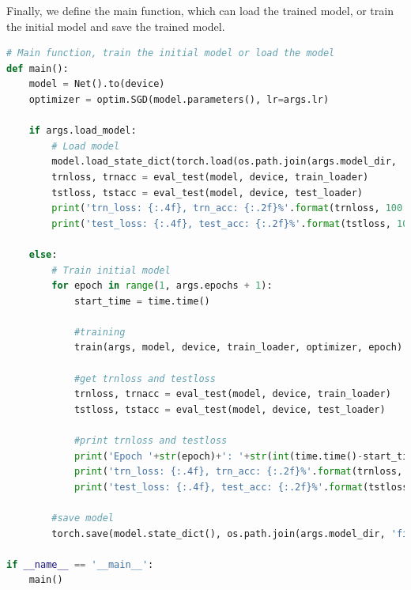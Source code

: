 Finally, we define the main function, which can load the trained model, or train the initial model and save the trained model.
\begin{lstlisting}[language=Python]
# Main function, train the initial model or load the model
def main():
    model = Net().to(device)
    optimizer = optim.SGD(model.parameters(), lr=args.lr)
    
    if args.load_model:
        # Load model
        model.load_state_dict(torch.load(os.path.join(args.model_dir, 'final_model.pt')))
        trnloss, trnacc = eval_test(model, device, train_loader)
        tstloss, tstacc = eval_test(model, device, test_loader)
        print('trn_loss: {:.4f}, trn_acc: {:.2f}%'.format(trnloss, 100. * trnacc), end=', ')
        print('test_loss: {:.4f}, test_acc: {:.2f}%'.format(tstloss, 100. * tstacc))
        
    else:
        # Train initial model
        for epoch in range(1, args.epochs + 1):
            start_time = time.time()

            #training
            train(args, model, device, train_loader, optimizer, epoch)

            #get trnloss and testloss
            trnloss, trnacc = eval_test(model, device, train_loader)
            tstloss, tstacc = eval_test(model, device, test_loader)

            #print trnloss and testloss
            print('Epoch '+str(epoch)+': '+str(int(time.time()-start_time))+'s', end=', ')
            print('trn_loss: {:.4f}, trn_acc: {:.2f}%'.format(trnloss, 100. * trnacc), end=', ')
            print('test_loss: {:.4f}, test_acc: {:.2f}%'.format(tstloss, 100. * tstacc))
        
        #save model
        torch.save(model.state_dict(), os.path.join(args.model_dir, 'final_model.pt'))

if __name__ == '__main__':
    main()
\end{lstlisting}